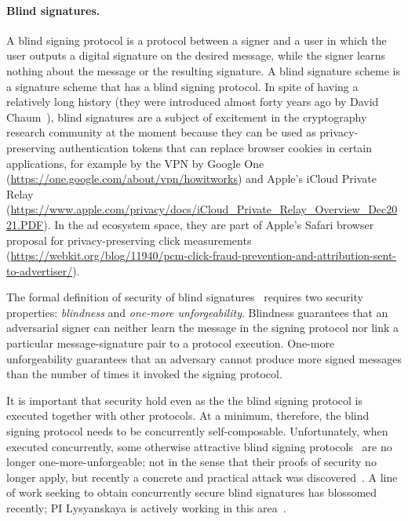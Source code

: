 \paragraph{Blind signatures.} A blind signing protocol is a protocol between a signer and a user in which the user outputs a digital signature on the desired message, while the signer learns nothing about the message or the resulting signature.
A blind signature scheme is a signature scheme that has a blind signing protocol.  In spite of having a relatively long history (they were introduced almost forty years ago by David Chaum~\cite{C:Chaum82}), blind signatures are a subject of excitement in the cryptography research community at the moment because they can be used as privacy-preserving authentication tokens that can replace browser cookies in certain applications, for example by the VPN by Google One (\url{https://one.google.com/about/vpn/howitworks}) and Apple's iCloud Private Relay (\url{https://www.apple.com/privacy/docs/iCloud_Private_Relay_Overview_Dec2021.PDF}). In the ad ecosystem space, they are part of 
Apple's Safari browser proposal for privacy-preserving click measurements (\url{https://webkit.org/blog/11940/pcm-click-fraud-prevention-and-attribution-sent-to-advertiser/}).

The formal definition of security of blind signatures~\cite{JC:PoiSte00,C:JueLubOst97,RSA:AbdNamNev06,JC:SchUnr17} requires two security properties: \emph{blindness} and \emph{one-more unforgeability}. Blindness guarantees that an adversarial signer can neither learn the message in the signing protocol nor link a particular message-signature pair to a protocol execution.  One-more unforgeability guarantees that an adversary cannot produce more signed messages than the number of times it invoked the signing protocol.  

It is important that security hold even as the the blind signing protocol is executed together with other protocols.  At a minimum, therefore, the blind signing protocol needs to be concurrently self-composable.
Unfortunately, when executed concurrently, some otherwise attractive blind signing protocols~\cite{C:Okamoto92,ICICS:Schnorr01,C:AbeOka00,C:Brands93,paquin2013u-prove,CCS:BalLys13,SP:STVWJG16,cryptoeprint:2017:682,JC:GJKR07} are no longer one-more-unforgeable; not in the sense that their proofs of security no longer apply, but recently a concrete and practical attack was discovered~\cite{EC:BLLOR21}. 
A line of work seeking to obtain concurrently secure blind signatures has blossomed recently; PI Lysyanskaya is actively working in this area~\cite{}.

